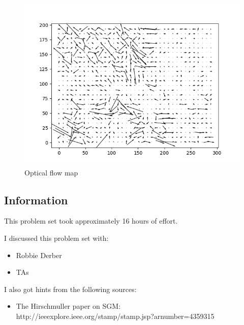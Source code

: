 \documentclass{article}
\newcommand{\info}{\clearpage \subsection*{Information}}
\begin{document}
\begin{figure}[!h]
  \centering
  \includegraphics[width=\textwidth]{code/outputs/prob4.png}
  \caption{Optical flow map}
\end{figure}

\info

This problem set took approximately 16 hours of effort.


I discussed this problem set with:
\begin{itemize}
\item Robbie Derber
\item TAs
\end{itemize}


I also got hints from the following sources:
\begin{itemize}
\item The Hirschmuller paper on SGM: http://ieeexplore.ieee.org/stamp/stamp.jsp?arnumber=4359315
\end{itemize}
\end{document}
